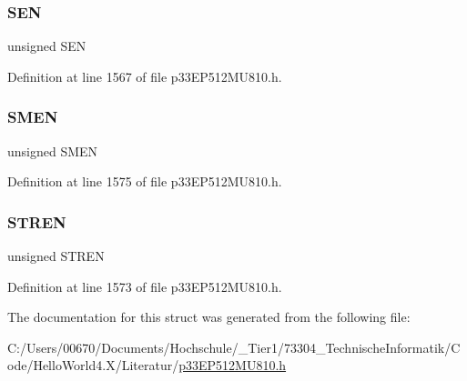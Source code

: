 \subsubsection{\texorpdfstring{S\+EN}{SEN}}
{\footnotesize\ttfamily unsigned S\+EN}



Definition at line 1567 of file p33\+E\+P512\+M\+U810.\+h.

\mbox{\label{structtag_i2_c2_c_o_n_b_i_t_s_a33a132b33aa2680e4316437c8fc45c4a}} 
\subsubsection{\texorpdfstring{S\+M\+EN}{SMEN}}
{\footnotesize\ttfamily unsigned S\+M\+EN}



Definition at line 1575 of file p33\+E\+P512\+M\+U810.\+h.

\mbox{\label{structtag_i2_c2_c_o_n_b_i_t_s_a815f4f81099ee6f7f25c4712495b47f9}} 
\subsubsection{\texorpdfstring{S\+T\+R\+EN}{STREN}}
{\footnotesize\ttfamily unsigned S\+T\+R\+EN}



Definition at line 1573 of file p33\+E\+P512\+M\+U810.\+h.



The documentation for this struct was generated from the following file\+:\begin{DoxyCompactItemize}
\item 
C\+:/\+Users/00670/\+Documents/\+Hochschule/\+\_\+\+Tier1/73304\+\_\+\+Technische\+Informatik/\+Code/\+Hello\+World4.\+X/\+Literatur/\hyperlink{p33_e_p512_m_u810_8h}{p33\+E\+P512\+M\+U810.\+h}\end{DoxyCompactItemize}
